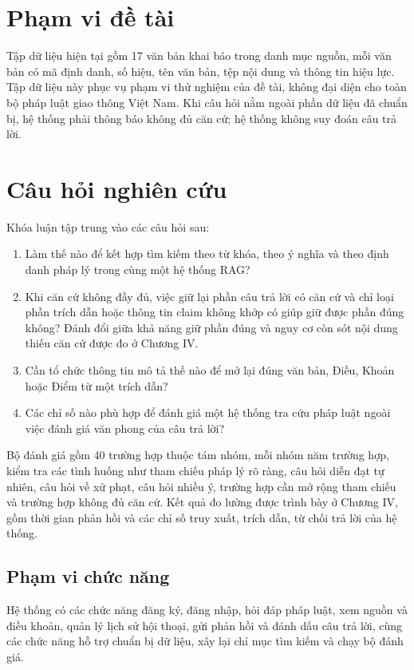 \documentclass[12pt,a4paper,oneside]{report}
\begin{document}
\section{Phạm vi đề tài}
Tập dữ liệu hiện tại gồm 17 văn bản khai báo trong danh mục nguồn, mỗi văn bản có mã định danh, số hiệu, tên văn bản, tệp nội dung và thông tin hiệu lực. Tập dữ liệu này phục vụ phạm vi thử nghiệm của đề tài, không đại diện cho toàn bộ pháp luật giao thông Việt Nam. Khi câu hỏi nằm ngoài phần dữ liệu đã chuẩn bị, hệ thống phải thông báo không đủ căn cứ; hệ thống không suy đoán câu trả lời.

\section{Câu hỏi nghiên cứu}
Khóa luận tập trung vào các câu hỏi sau:
\begin{enumerate}
  \item Làm thế nào để kết hợp tìm kiếm theo từ khóa, theo ý nghĩa và theo định danh pháp lý trong cùng một hệ thống RAG?
  \item Khi căn cứ không đầy đủ, việc giữ lại phần câu trả lời có căn cứ và chỉ loại phần trích dẫn hoặc thông tin claim không khớp có giúp giữ được phần đúng không? Đánh đổi giữa khả năng giữ phần đúng và nguy cơ còn sót nội dung thiếu căn cứ được đo ở Chương IV.
  \item Cần tổ chức thông tin mô tả thế nào để mở lại đúng văn bản, Điều, Khoản hoặc Điểm từ một trích dẫn?
  \item Các chỉ số nào phù hợp để đánh giá một hệ thống tra cứu pháp luật ngoài việc đánh giá văn phong của câu trả lời?
\end{enumerate}
Bộ đánh giá gồm 40 trường hợp thuộc tám nhóm, mỗi nhóm năm trường hợp, kiểm tra các tình huống như tham chiếu pháp lý rõ ràng, câu hỏi diễn đạt tự nhiên, câu hỏi về xử phạt, câu hỏi nhiều ý, trường hợp cần mở rộng tham chiếu và trường hợp không đủ căn cứ. Kết quả đo lường được trình bày ở Chương IV, gồm thời gian phản hồi và các chỉ số truy xuất, trích dẫn, từ chối trả lời của hệ thống.

\subsection{Phạm vi chức năng}
Hệ thống có các chức năng đăng ký, đăng nhập, hỏi đáp pháp luật, xem nguồn và điều khoản, quản lý lịch sử hội thoại, gửi phản hồi và đánh dấu câu trả lời, cùng các chức năng hỗ trợ chuẩn bị dữ liệu, xây lại chỉ mục tìm kiếm và chạy bộ đánh giá.
\end{document}
